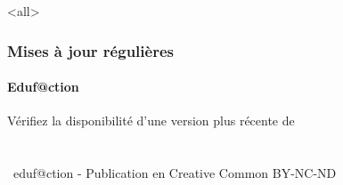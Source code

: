 \documentclass[ignorenonframetext,allowframebreaks,aspectratio=169,t,8pt, xcolor=table]{beamer}
\begin{document}
\mode<all>{}
\begin{frame}
\frametitle{Mises à jour régulières}
\framesubtitle{Eduf@ction~\umaila}
{\begin{center} 
{Vérifiez la disponibilité d'une version plus récente de} \\
{ }   \\ 
{{\huge\ccbyncndeu}}  \\  
{\the\year~eduf@ction - Publication en Creative Common BY-NC-ND }    \\  %
{\safeqrcode[padding]{\GITfilename}}  
\end{center} }
\end{frame}
\end{document}
